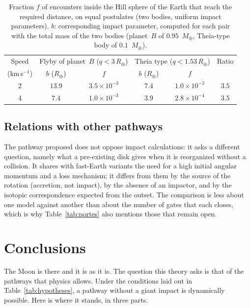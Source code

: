 \documentclass[11pt,a4paper]{article}
\newcommand{\Rt}{\ensuremath{R_\oplus}}
\newcommand{\Mt}{\ensuremath{M_\oplus}}
\begin{document}
\begin{table}[htbp]
\centering
\caption{Fraction $f$ of encounters inside the Hill sphere of the Earth that reach the required distance, on equal postulates (two bodies, uniform impact parameters). $b$: corresponding impact parameter, computed for each pair with the total mass of the two bodies (planet~$B$ of $0.95$~$\Mt$, Theia-type body of $0.1$~$\Mt$).\label{tab:rencontre}}
\small
\begin{tabular}{cccccc}
\toprule
Speed & \multicolumn{2}{c}{Flyby of planet~$B$ ($q<3\,\Rt$)} & \multicolumn{2}{c}{Theia type ($q<1.53\,\Rt$)} & Ratio \\
(km\,s$^{-1}$) & $b$ ($\Rt$) & $f$ & $b$ ($\Rt$) & $f$ & \\
\midrule
2 & $13.9$ & $3.5\times10^{-3}$ & $7.4$ & $1.0\times10^{-3}$ & $3.5$ \\
4 & $7.4$ & $1.0\times10^{-3}$ & $3.9$ & $2.8\times10^{-4}$ & $3.5$ \\
\bottomrule
\end{tabular}
\end{table}

\subsection{Relations with other pathways}

The pathway proposed does not oppose impact calculations: it asks a different question, namely what a pre-existing disk gives when it is reorganized without a collision. It shares with fast-Earth variants the need for a high initial angular momentum and a loss mechanism; it differs from them by the source of the rotation (accretion, not impact), by the absence of an impactor, and by the isotopic correspondence expected from the outset. The comparison is less about one model against another than about the number of gates that each closes, which is why Table~\ref{tab:portes} also mentions those that remain open.

\section{Conclusions}
\label{sec:conclusions}

The Moon is there and it is as it is. The question this theory asks is that of the pathways that physics allows. Under the conditions laid out in Table~\ref{tab:hypotheses}, a pathway without a giant impact is dynamically possible. Here is where it stands, in three parts.
\end{document}
